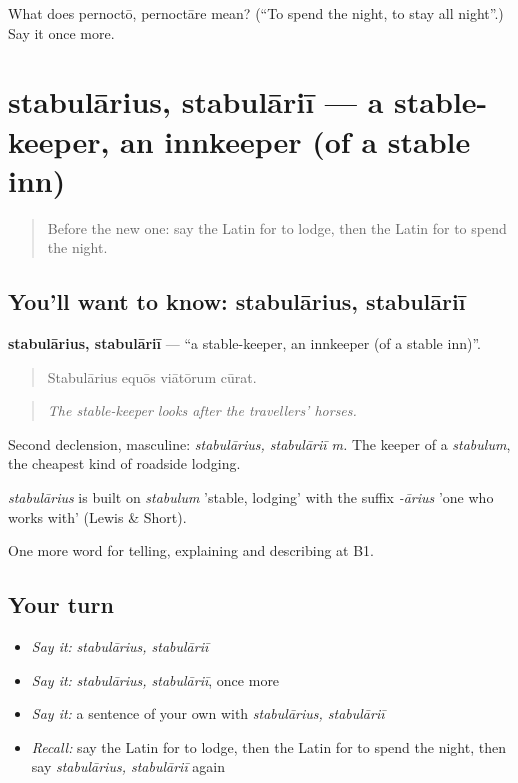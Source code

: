 \begin{tcolorbox}[breakable,colback=teal!4,colframe=teal!35!black,title={Before you move on}]
What does pernoctō, pernoctāre mean? (\textquotedblleft{}To spend the night, to stay all night\textquotedblright{}.) Say it once more.
\end{tcolorbox}
\section[stabulārius, stabulāriī]{stabulārius, stabulāriī — a stable-keeper, an innkeeper (of a stable inn)}

\label{lesson:LA-C445-stabularius}



\begin{quote}
Before the new one: say the Latin for to lodge, then the Latin for to spend the night.
\end{quote}

\subsection*{You'll want to know: stabulārius, stabulāriī}
\textbf{stabulārius, stabulāriī} — \textquotedblleft{}a stable-keeper, an innkeeper (of a stable inn)\textquotedblright{}.

\begin{quote}
Stabulārius equōs viātōrum cūrat.
\end{quote}

\begin{quote}
\emph{The stable-keeper looks after the travellers' horses.}
\end{quote}

Second declension, masculine: \emph{stabulārius, stabulāriī m.} The keeper of a \emph{stabulum}, the cheapest kind of roadside lodging.

\begin{cousinweb}
\emph{stabulārius} is built on \emph{stabulum} 'stable, lodging' with the suffix \emph{-ārius} 'one who works with' (Lewis \& Short).
\end{cousinweb}

\begin{grammarlens}[title={What you've built}]
One more word for telling, explaining and describing at B1.
\end{grammarlens}

\subsection*{Your turn}
\begin{itemize}
\raggedright
  \item \emph{Say it:} \emph{stabulārius, stabulāriī}
  \item \emph{Say it:} \emph{stabulārius, stabulāriī}, once more
  \item \emph{Say it:} a sentence of your own with \emph{stabulārius, stabulāriī}
  \item \emph{Recall:} say the Latin for to lodge, then the Latin for to spend the night, then say \emph{stabulārius, stabulāriī} again
\end{itemize}

